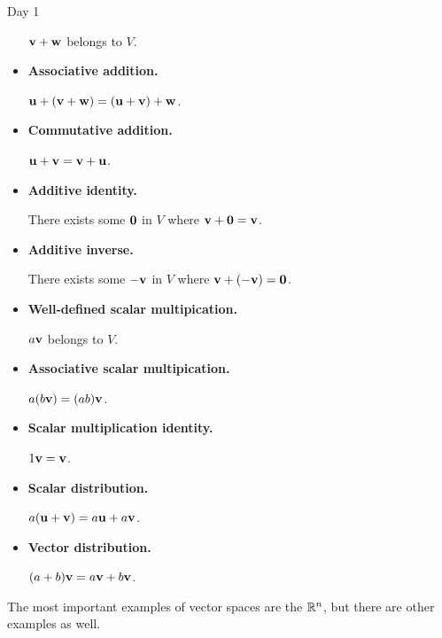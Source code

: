 \begin{applicationActivities}{Day 1}
\begin{definition}
\begin{multicols}{2}
\begin{itemize}
          \(\mathbf v+\mathbf w\) belongs to \(V\).
    \item \textbf{Associative addition.}

          \(\mathbf u+(\mathbf v+\mathbf w)=
          (\mathbf u+\mathbf v)+\mathbf w\).
    \item \textbf{Commutative addition.}

          \(\mathbf u+\mathbf v=
          \mathbf v+\mathbf u\).
    \item \textbf{Additive identity.}

          There exists some \(\mathbf 0\) in \(V\)
          where \(\mathbf v+\mathbf 0=\mathbf v\).
    \item \textbf{Additive inverse.}

          There exists some \(-\mathbf v\) in \(V\)
          where \(\mathbf v+(-\mathbf v)=\mathbf 0\).
    \item \textbf{Well-defined scalar multipication.}

          \(a\mathbf v\) belongs to
          \(V\).
    \item \textbf{Associative scalar multipication.}

          \(a(b\mathbf v)=(ab)\mathbf v\).
    \item \textbf{Scalar multiplication identity.}

          \(1\mathbf v=\mathbf v\).
    \item \textbf{Scalar distribution.}

          \(a(\mathbf u+\mathbf v)=a\mathbf u+a\mathbf v\).
    \item \textbf{Vector distribution.}

          \((a+b)\mathbf v=a\mathbf v+b\mathbf v\).
  \end{itemize}
  \end{multicols}
\end{definition}

\begin{definition}
  The most important examples of vector spaces are the  \(\mathbb{R}^n\), but there are other examples as well.
\end{definition}


\end{applicationActivities}
